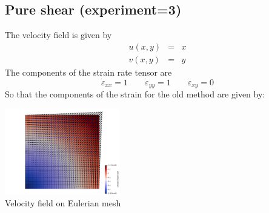 \newpage
\subsection*{Pure shear (experiment=3)}

The velocity field is given by
\begin{eqnarray}
u(x,y)&=&x \nonumber\\
v(x,y)&=&y \nonumber
\end{eqnarray}
The components of the strain rate tensor are
\[
\dot\varepsilon_{xx} = 1 
\qquad
\dot\varepsilon_{yy} = 1
\qquad
\dot\varepsilon_{xy} = 0 
\]
So that the components of the strain for the old method are given by:




\begin{center}
\includegraphics[width=5cm]{python_codes/fieldstone_89/results/pureshear/vel}\\
{\captionfont Velocity field on Eulerian mesh}
\end{center}

